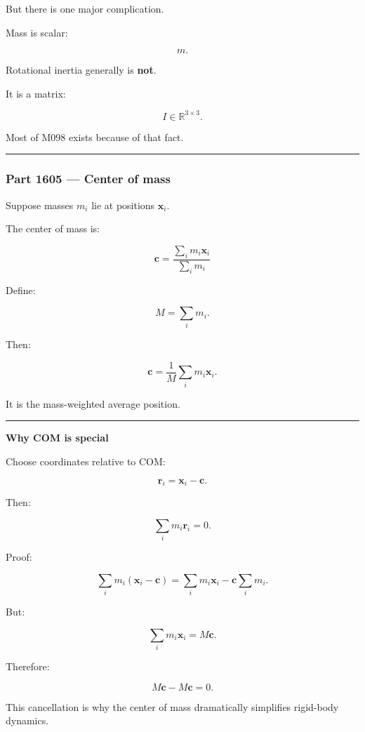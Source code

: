 But there is one major complication.

Mass is scalar:

\[
m.
\]

Rotational inertia generally is \textbf{not}.

It is a matrix:

\[
I\in\mathbb{R}^{3\times3}.
\]

Most of M098 exists because of that fact.

\begin{center}\rule{0.5\linewidth}{0.5pt}\end{center}

\subsubsection{Part 1605 --- Center of mass}\label{part-1605-center-of-mass}

Suppose masses \(m_i\) lie at positions \(\mathbf{x}_i\).

The center of mass is:

\[
\boxed{
\mathbf{c}
=
\frac{\sum_i m_i\mathbf{x}_i}
{\sum_i m_i}
}
\]

Define:

\[
M=\sum_i m_i.
\]

Then:

\[
\mathbf{c}
=
\frac{1}{M}
\sum_i
m_i\mathbf{x}_i.
\]

It is the mass-weighted average position.

\begin{center}\rule{0.5\linewidth}{0.5pt}\end{center}

\textbf{Why COM is special}

Choose coordinates relative to COM:

\[
\mathbf{r}_i
=
\mathbf{x}_i-\mathbf{c}.
\]

Then:

\[
\sum_i m_i\mathbf{r}_i
=
0.
\]

Proof:

\[
\sum_i m_i(\mathbf{x}_i-\mathbf{c})
=
\sum_i m_i\mathbf{x}_i
-
\mathbf{c}\sum_i m_i.
\]

But:

\[
\sum_i m_i\mathbf{x}_i
=
M\mathbf{c}.
\]

Therefore:

\[
M\mathbf{c}-M\mathbf{c}=0.
\]

This cancellation is why the center of mass dramatically simplifies rigid-body dynamics.

